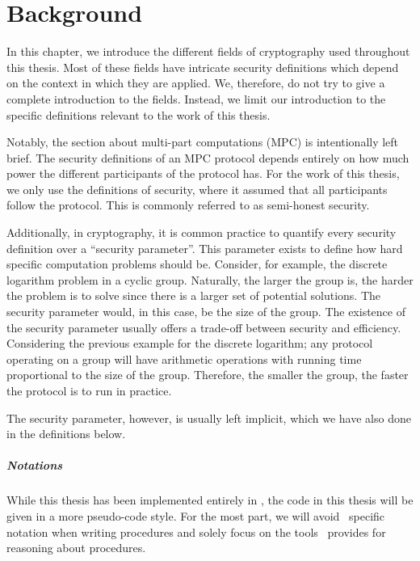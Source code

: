 \chapter{Background}
\label{ch:background}
In this chapter, we introduce the different fields of cryptography used
throughout this thesis.
Most of these fields have intricate security definitions which depend on the
context in which they are applied.
We, therefore, do not try to give a complete introduction to the fields.
Instead, we limit our introduction to the specific definitions relevant to the work of this thesis.

Notably, the section about multi-part computations (MPC) is intentionally left
brief.
The security definitions of an MPC protocol depends entirely on how much power
the different participants of the protocol has. For the work of this thesis, we
only use the definitions of security, where it assumed that all participants
follow the protocol. This is commonly referred to as semi-honest security.

Additionally, in cryptography, it is common practice to quantify every security
definition over a ``security parameter''. This parameter exists to define how
hard specific computation problems should be. Consider, for example, the discrete
logarithm problem in a cyclic group. Naturally, the larger the group is,
the harder the problem is to solve since there is a larger set of potential solutions. The
security parameter would, in this case, be the size of the group.
The existence of the security parameter usually offers a trade-off between
security and efficiency. Considering the previous example for the discrete
logarithm; any protocol operating on a group will have arithmetic operations
with running time proportional to the size of the group. Therefore, the smaller
the group, the faster the protocol is to run in practice.

The security parameter, however, is usually left implicit, which we have also
done in the definitions below.

\paragraph{Notations}
While this thesis has been implemented entirely in \easycrypt, the code in this
thesis will be given in a more pseudo-code style. For
the most part, we will avoid \easycrypt\ specific notation when writing procedures
and solely focus on the tools \easycrypt\ provides for reasoning about procedures.

